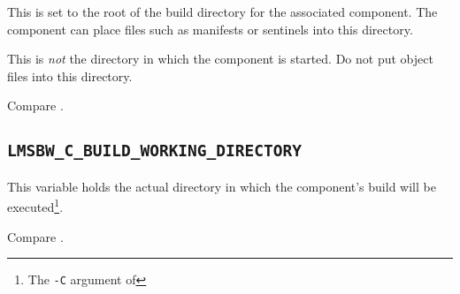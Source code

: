 This is set to the root of the build directory for the associated
component.  The component \makefile can place files such as \mtree
manifests or \make sentinels into this directory.

This is \emph{not} the directory in which the component \makefile is
started.   Do not put object files into this directory.

Compare .

\subsection{\texttt{LMSBW\_C\_BUILD\_WORKING\_DIRECTORY}}\label{wrap:lmsbw-c-build-working-directory}

This variable holds the actual directory in which the component's
build will be executed\footnote{The \texttt{-C} argument of \make}.

Compare .

